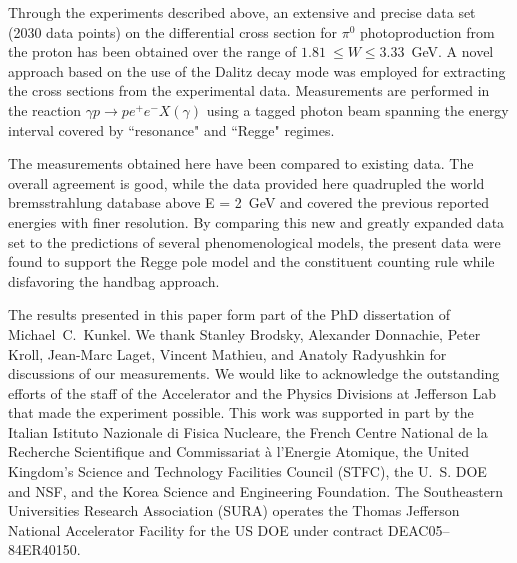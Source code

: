 \documentclass[aps,prc,twocolumn,floatfix,showpacs,preprintnumbers,amsmath,amssymb,superscriptaddress,linenumbers]{revtex4-1}
\begin{document}

Through the experiments described above, an extensive and precise 
data set (2030 data points) on the differential cross section for 
$\pi^0$ photoproduction from the proton has been obtained over 
the range of $1.81~\leq W\leq 3.33$~GeV. A novel approach based 
on the use of the Dalitz decay mode was employed for extracting 
the cross sections from the experimental data. Measurements are 
performed in the reaction $\gamma p\rightarrow pe^+e^-X(\gamma)$ 
using a tagged photon beam spanning the energy interval covered 
by ``resonance" and ``Regge" regimes.

The measurements obtained here have been compared to existing 
data. The overall agreement is good, while the data provided 
here quadrupled the world bremsstrahlung database above E = 
2~GeV and covered the previous reported energies with finer 
resolution. By comparing this new and greatly expanded data set 
to the predictions of several phenomenological models, the 
present data were found to support the Regge pole model and the 
constituent counting rule while disfavoring the handbag approach.
  
The results presented in this paper form part of the 
PhD dissertation of Michael~C.~Kunkel.  We thank Stanley Brodsky, 
Alexander Donnachie, Peter Kroll, Jean-Marc Laget, Vincent Mathieu, 
and Anatoly Radyushkin for discussions of our measurements. We 
would like to acknowledge the outstanding efforts of the staff of 
the Accelerator and the Physics Divisions at Jefferson Lab that 
made the experiment possible.  This work was supported in part by 
the Italian Istituto Nazionale di Fisica Nucleare, the French 
Centre National de la Recherche Scientifique and Commissariat \`a 
l'Energie Atomique, the United Kingdom's Science and Technology 
Facilities Council (STFC), the U.~S. DOE and NSF, and the Korea 
Science and Engineering Foundation. The Southeastern Universities 
Research Association (SURA) operates the Thomas Jefferson National 
Accelerator Facility for the US DOE under contract DEAC05--84ER40150.
\end{document}
